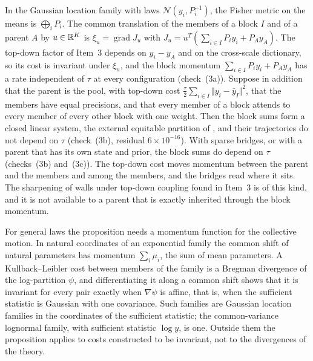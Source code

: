 \documentclass[11pt,letterpaper]{report}
\begin{document}
In the Gaussian location family with laws $\mathcal N(y_i,P_i^{-1})$, the Fisher metric on the means is $\bigoplus_iP_i$. The common translation of the members of a block $I$ and of a parent $A$ by $u\in\mathbb R^K$ is $\xi_u=\operatorname{grad}J_u$ with $J_u=u^T(\sum_{i\in I}P_iy_i+P_Ay_A)$. The top-down factor of Item~3 depends on $y_i-y_A$ and on the cross-scale dictionary, so its cost is invariant under $\xi_u$, and the block momentum $\sum_{i\in I}P_iy_i+P_Ay_A$ has a rate independent of $\tau$ at every configuration (check~(3a)). Suppose in addition that the parent is the pool, with top-down cost $\frac\tau2\sum_{i\in I}\Vert y_i-\bar y_I\Vert^2$, that the members have equal precisions, and that every member of a block attends to every member of every other block with one weight. Then the block sums form a closed linear system, the external equitable partition of \citet{OClery2013}, and their trajectories do not depend on $\tau$ (check~(3b), residual $6\times10^{-16}$). With sparse bridges, or with a parent that has its own state and prior, the block sums do depend on $\tau$ (checks~(3b) and~(3c)). The top-down cost moves momentum between the parent and the members and among the members, and the bridges read where it sits. The sharpening of walls under top-down coupling found in Item~3 is of this kind, and it is not available to a parent that is exactly inherited through the block momentum.

For general laws the proposition needs a momentum function for the collective motion. In natural coordinates of an exponential family the common shift of natural parameters has momentum $\sum_i\mu_i$, the sum of mean parameters. A Kullback--Leibler cost between members of the family is a Bregman divergence of the log-partition $\psi$, and differentiating it along a common shift shows that it is invariant for every pair exactly when $\nabla\psi$ is affine, that is, when the sufficient statistic is Gaussian with one covariance. Such families are Gaussian location families in the coordinates of the sufficient statistic; the common-variance lognormal family, with sufficient statistic $\log y$, is one. Outside them the proposition applies to costs constructed to be invariant, not to the divergences of the theory.
\end{document}

